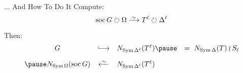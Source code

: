 
\begin{frame}{... And How To Do It}
    Compute:
    \[
        \soc G \circlearrowright \Omega
        \iso
        T ^ \ell \circlearrowright \Delta ^ \ell
    \]
    \pause

    Then:
    \[
    \begin{array}{ccll}
        G                                   & \lhook\joinrel\longrightarrow
        & N_{\sym \Delta ^ \ell}(T ^ \ell)
        \pause
                                            & = ~ N_{\sym \Delta}(T) \wr S_\ell
        \\[1em]
        \pause
        N_{\sym \Omega}(\soc G)
        &
        \xleftarrow{\,\raisebox{-1pt}{\ensuremath{\scriptstyle{\sim}}}\,}
        & N_{\sym \Delta ^ \ell}(T ^ \ell)
    \end{array}
    \]
\end{frame}

